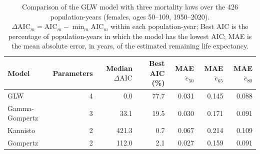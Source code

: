 \begin{table}[htb!]
\centering
\small
\caption{Comparison of the GLW model with three mortality laws over the 426 population-years (females, ages 50--109, 1950--2020). $\Delta\mathrm{AIC}_m=\mathrm{AIC}_m-\min_m\mathrm{AIC}_m$ within each population-year; Best AIC is the percentage of population-years in which the model has the lowest AIC; MAE is the mean absolute error, in years, of the estimated remaining life expectancy.}
\label{tab:benchmark}
\begin{tabular*}{\textwidth}{@{\extracolsep{\fill}}lrrrrrr}
\toprule
Model & Parameters & Median $\Delta\mathrm{AIC}$ & Best AIC (\%) & MAE $\mathring{e}_{50}$ & MAE $\mathring{e}_{65}$ & MAE $\mathring{e}_{80}$\\
\midrule
GLW & 4 & 0.0 & 77.7 & 0.031 & 0.145 & 0.088\\
Gamma-Gompertz & 3 & 33.1 & 19.5 & 0.030 & 0.171 & 0.091\\
Kannisto & 2 & 421.3 & 0.7 & 0.067 & 0.214 & 0.109\\
Gompertz & 2 & 112.0 & 2.1 & 0.027 & 0.159 & 0.091\\
\bottomrule
\end{tabular*}
\end{table}
